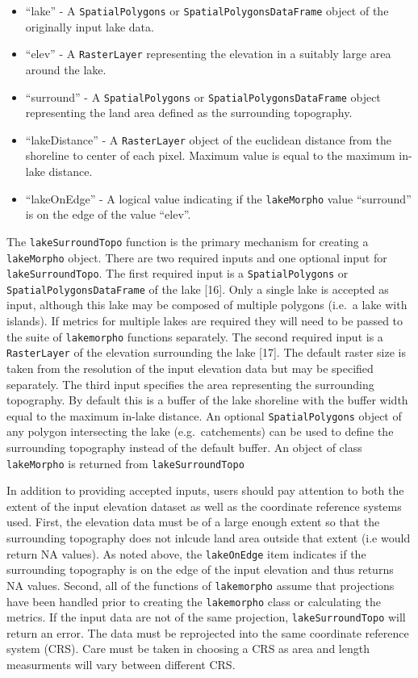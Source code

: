 \documentclass[11pt,]{article}
\providecommand{\tightlist}{%
  \setlength{\itemsep}{0pt}\setlength{\parskip}{0pt}}
\begin{document}
\begin{itemize}
\tightlist
\item
  ``lake'' - A \texttt{SpatialPolygons} or
  \texttt{SpatialPolygonsDataFrame} object of the originally input lake
  data.
\item
  ``elev'' - A \texttt{RasterLayer} representing the elevation in a
  suitably large area around the lake.
\item
  ``surround'' - A \texttt{SpatialPolygons} or
  \texttt{SpatialPolygonsDataFrame} object representing the land area
  defined as the surrounding topography.
\item
  ``lakeDistance'' - A \texttt{RasterLayer} object of the euclidean
  distance from the shoreline to center of each pixel. Maximum value is
  equal to the maximum in-lake distance.
\item
  ``lakeOnEdge'' - A logical value indicating if the \texttt{lakeMorpho}
  value ``surround'' is on the edge of the value ``elev''.
\end{itemize}

The \texttt{lakeSurroundTopo} function is the primary mechanism for
creating a \texttt{lakeMorpho} object. There are two required inputs and
one optional input for \texttt{lakeSurroundTopo}. The first required
input is a \texttt{SpatialPolygons} or \texttt{SpatialPolygonsDataFrame}
of the lake {[}16{]}. Only a single lake is accepted as input, although
this lake may be composed of multiple polygons (i.e.~a lake with
islands). If metrics for multiple lakes are required they will need to
be passed to the suite of \texttt{lakemorpho} functions separately. The
second required input is a \texttt{RasterLayer} of the elevation
surrounding the lake {[}17{]}. The default raster size is taken from the
resolution of the input elevation data but may be specified separately.
The third input specifies the area representing the surrounding
topography. By default this is a buffer of the lake shoreline with the
buffer width equal to the maximum in-lake distance. An optional
\texttt{SpatialPolygons} object of any polygon intersecting the lake
(e.g.~catchements) can be used to define the surrounding topography
instead of the default buffer. An object of class \texttt{lakeMorpho} is
returned from \texttt{lakeSurroundTopo}

In addition to providing accepted inputs, users should pay attention to
both the extent of the input elevation dataset as well as the coordinate
reference systems used. First, the elevation data must be of a large
enough extent so that the surrounding topography does not inlcude land
area outside that extent (i.e would return NA values). As noted above,
the \texttt{lakeOnEdge} item indicates if the surrounding topography is
on the edge of the input elevation and thus returns NA values. Second,
all of the functions of \texttt{lakemorpho} assume that projections have
been handled prior to creating the \texttt{lakemorpho} class or
calculating the metrics. If the input data are not of the same
projection, \texttt{lakeSurroundTopo} will return an error. The data
must be reprojected into the same coordinate reference system (CRS).
Care must be taken in choosing a CRS as area and length measurments will
vary between different CRS.
\end{document}
